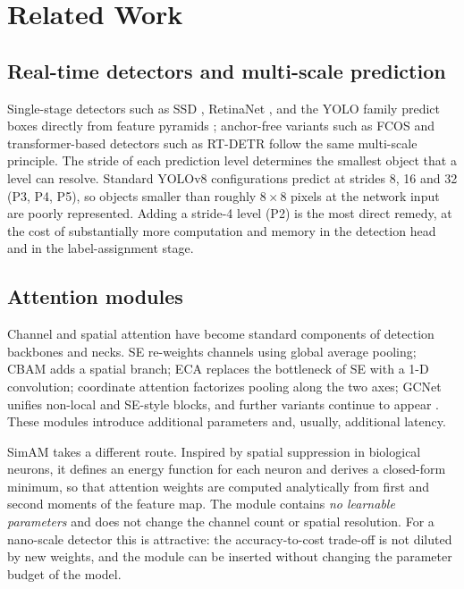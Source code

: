 \documentclass[pdflatex,sn-basic,Numbered]{sn-jnl}%
\begin{document}
\section{Related Work}\label{sec:related}

\subsection{Real-time detectors and multi-scale prediction}

Single-stage detectors such as SSD \cite{liu2016ssd}, RetinaNet \cite{lin2017focal}, and the YOLO family \cite{redmon2016yolo,bochkovskiy2020yolov4,ge2021yolox,li2022yolov6,wang2023yolov7,jocher2023ultralytics,ultralytics2024yolo11} predict boxes directly from feature pyramids \cite{lin2017fpn}; anchor-free variants such as FCOS \cite{tian2019fcos} and transformer-based detectors such as RT-DETR \cite{zhao2024rtdetr} follow the same multi-scale principle. The stride of each prediction level determines the smallest object that a level can resolve. Standard YOLOv8 configurations predict at strides 8, 16 and 32 (P3, P4, P5), so objects smaller than roughly $8\times8$ pixels at the network input are poorly represented. Adding a stride-4 level (P2) is the most direct remedy, at the cost of substantially more computation and memory in the detection head and in the label-assignment stage.

\subsection{Attention modules}

Channel and spatial attention have become standard components of detection backbones and necks. SE \cite{hu2018senet} re-weights channels using global average pooling; CBAM \cite{woo2018cbam} adds a spatial branch; ECA \cite{wang2020eca} replaces the bottleneck of SE with a 1-D convolution; coordinate attention \cite{hou2021ca} factorizes pooling along the two axes; GCNet \cite{cao2019gcnet} unifies non-local and SE-style blocks, and further variants continue to appear \cite{misra2021triplet}. These modules introduce additional parameters and, usually, additional latency.

SimAM \cite{yang2021simam} takes a different route. Inspired by spatial suppression in biological neurons, it defines an energy function for each neuron and derives a closed-form minimum, so that attention weights are computed analytically from first and second moments of the feature map. The module contains \emph{no learnable parameters} and does not change the channel count or spatial resolution. For a nano-scale detector this is attractive: the accuracy-to-cost trade-off is not diluted by new weights, and the module can be inserted without changing the parameter budget of the model.
\end{document}
